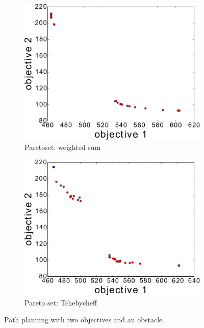 \documentclass{article}
\begin{document}
\begin{figure}[h!]
\begin{subfigure}[b]{0.35\linewidth}
		\includegraphics[width=\textwidth]{fig/sim4-obstacle/PF04-MORRT.pdf}
		\caption{Paretoset: weighted sum}
		\label{fig:sim:obs:pf:a}
	\end{subfigure}
	\begin{subfigure}[b]{0.35\linewidth}
		\centering
		\includegraphics[width=\textwidth]{fig/sim5-obstacle/PF05-MORRT2.pdf}
		\caption{Pareto set: Tchebycheff}
		\label{fig:sim:obs:pf:b}
	\end{subfigure} 
	\caption{Path planning with two objectives and an obstacle.}
	\label{fig:sim:obs}
\end{figure}
\end{document}
